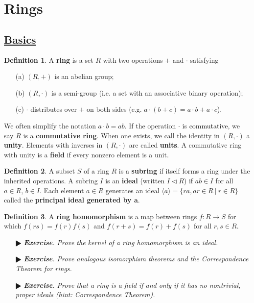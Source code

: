 \documentclass[11pt]{amsart}
\theoremstyle{definition}
\newtheorem*{definition*}{Definition}
\renewcommand\:{\colon}
\newcommand{\1}{\mathds{1}}
\newcommand{\exc}[1]{\vspace{-2.5pt}\begin{itemize}[leftmargin=15pt]\item[$\RHD$] \textit{\textbf{Exercise}. #1}\end{itemize}}
\begin{document}
\section{Rings}

\subsection*{\underline{Basics}}

\begin{definition*}
	A \textbf{ring} is a set $R$ with two operations $+$ and $\cdot$ satisfying
	\begin{itemize}[leftmargin=22.5pt]\setlength\itemsep{0em}
		\item[\textnormal{(a)}] $(R, +)$ is an abelian group;
		\item[\textnormal{(b)}] $(R, \cdot)$ is a semi-group (i.e. a set with an associative binary operation);
		\item[\textnormal{(c)}] $\cdot$ distributes over $+$ on both sides (e.g. $a \cdot (b + c) = a \cdot b + a \cdot c$).
	\end{itemize}
	We often simplify the notation $a \cdot b = ab$. If the operation $\cdot$ is commutative, we say $R$ is a \textbf{commutative ring}. When one exists, we call the identity in $(R, \cdot)$ a \textbf{unity}. Elements with inverses in $(R, \cdot)$ are called \textbf{units}.	A commutative ring with unity is a \textbf{field} if every nonzero element is a unit.
\end{definition*}

\begin{definition*}
	A subset $S$ of a ring $R$ is a \textbf{subring} if itself forms a ring under the inherited operations. A subring $I$ is an \textbf{ideal} (written $I \triangleleft R$) if $ab \in I$ for all $a \in R$, $b \in I$. Each element $a \in R$ generates an ideal $\langle a \rangle = \{ ra, ar \in R \ | \ r \in R\}$ called the \textbf{principal ideal generated by $\boldsymbol{a}$}.
\end{definition*}

\begin{definition*}
	A \textbf{ring homomorphism} is a map between rings $f\: R \to S$ for which $f(rs) = f(r)f(s)$ and $f(r + s) = f(r) + f(s)$ for all $r, s \in R$.
\end{definition*}

\exc{Prove the kernel of a ring homomorphism is an ideal.}
\exc{Prove analogous isomorphism theorems and the Correspondence Theorem for rings.}
\exc{Prove that a ring is a field if and only if it has no nontrivial, proper ideals \textnormal{(}hint: Correspondence Theorem\textnormal{)}.}
\end{document}
